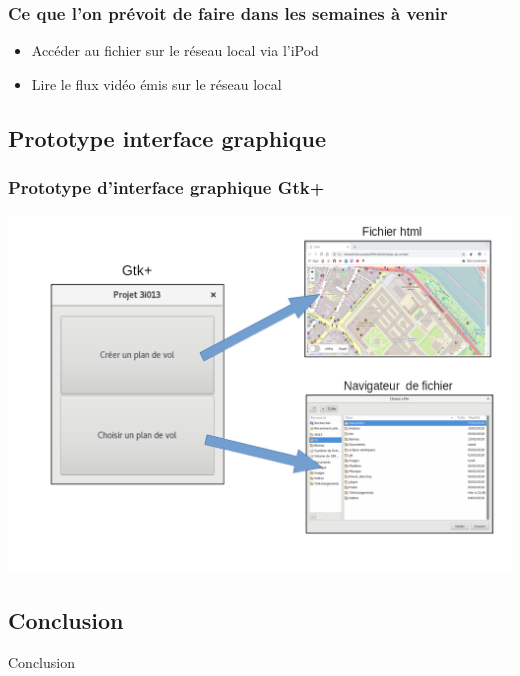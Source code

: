 \documentclass{beamer}
\begin{document}
	\begin{frame}
	\frametitle{Ce que l'on prévoit de faire dans les semaines à venir}
	\begin{itemize}
		\item Accéder au fichier sur le réseau local via l'iPod
		\item Lire le flux vidéo émis sur le réseau local
	\end{itemize}
	\end{frame}
	
	\begin{frame}
	\section{Prototype interface graphique}
		\begin{center}
		\frametitle{Prototype d'interface graphique Gtk+}		
		\includegraphics[scale=0.35]{schema_GUI.png}
		\end{center}
	\end{frame}
	
	\begin{frame}
	\section{Conclusion}
	\begin{center}
	\begin{Huge}
	Conclusion
	\end{Huge}
	\end{center}
	\end{frame}
	
\end{document}
